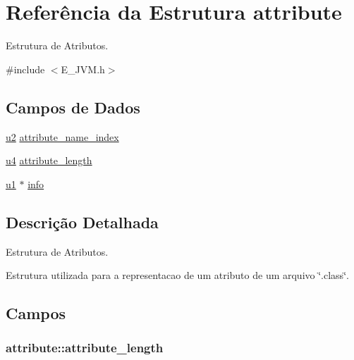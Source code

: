 \hypertarget{structattribute}{}\section{Referência da Estrutura attribute}
\label{structattribute}


Estrutura de Atributos.  




{\ttfamily \#include $<$E\+\_\+\+J\+V\+M.\+h$>$}

\subsection*{Campos de Dados}
\begin{DoxyCompactItemize}
\item 
\hyperlink{_e___j_v_m_8h_a5f223212eef04d10a4550ded680cb1cf}{u2} \hyperlink{structattribute_a55761ad4a2ed18b8f88baf6ac062cb46}{attribute\+\_\+name\+\_\+index}
\item 
\hyperlink{_e___j_v_m_8h_aedf6ddc03df8caaaccbb4c60b9a9b850}{u4} \hyperlink{structattribute_a3d9b605228c53c92be5e5b49ff24a35c}{attribute\+\_\+length}
\item 
\hyperlink{_e___j_v_m_8h_a216a9f8b04b4f0af84a4ca9d1d85a6ca}{u1} $\ast$ \hyperlink{structattribute_ac749b125ccc9eda0cfe9deb4fe4aeda9}{info}
\end{DoxyCompactItemize}


\subsection{Descrição Detalhada}
Estrutura de Atributos. 

Estrutura utilizada para a representacao de um atributo de um arquivo \char`\"{}.\+class\char`\"{}. 

\subsection{Campos}
\hypertarget{structattribute_a3d9b605228c53c92be5e5b49ff24a35c}{}
\subsubsection[{attribute\+\_\+length}]{ attribute\+::attribute\+\_\+length}\label{structattribute_a3d9b605228c53c92be5e5b49ff24a35c}
\hypertarget{structattribute_a55761ad4a2ed18b8f88baf6ac062cb46}{}
